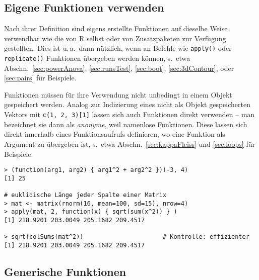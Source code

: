 \subsection{Eigene Funktionen verwenden}
\label{sec:functionUse}

Nach ihrer Definition sind eigens erstellte Funktionen auf dieselbe Weise verwendbar wie die von R selbst oder von Zusatzpaketen zur Verfügung gestellten. Dies ist u.\,a.\ dann nützlich, wenn an Befehle wie \lstinline!apply()! oder \lstinline!replicate()! Funktionen übergeben werden können, s.\ etwa Abschn.\ \ref{sec:powerAnova}, \ref{sec:runsTest}, \ref{sec:boot}, \ref{sec:3dContour}, oder \ref{sec:pairs} für Beispiele.

Funktionen müssen für ihre Verwendung nicht unbedingt in einem Objekt gespeichert werden. Analog zur Indizierung eines nicht als Objekt gespeicherten Vektors mit \lstinline!c(1, 2, 3)[1]! lassen sich auch Funktionen direkt verwenden -- man bezeichnet sie dann als \emph{anonyme}, weil namenlose Funktionen. Diese lassen sich direkt innerhalb eines Funktionsaufrufs definieren, wo eine Funktion als Argument zu übergeben ist, s.\ etwa Abschn.\ \ref{sec:kappaFleiss} und \ref{sec:loops} für Beispiele.
\begin{lstlisting}
> (function(arg1, arg2) { arg1^2 + arg2^2 })(-3, 4)
[1] 25

# euklidische Länge jeder Spalte einer Matrix
> mat <- matrix(rnorm(16, mean=100, sd=15), nrow=4)
> apply(mat, 2, function(x) { sqrt(sum(x^2)) } )
[1] 218.9201 203.0049 205.1682 209.4517

> sqrt(colSums(mat^2))                      # Kontrolle: effizienter
[1] 218.9201 203.0049 205.1682 209.4517
\end{lstlisting}

\subsection{Generische Funktionen}
\label{sec:funcGeneric}

